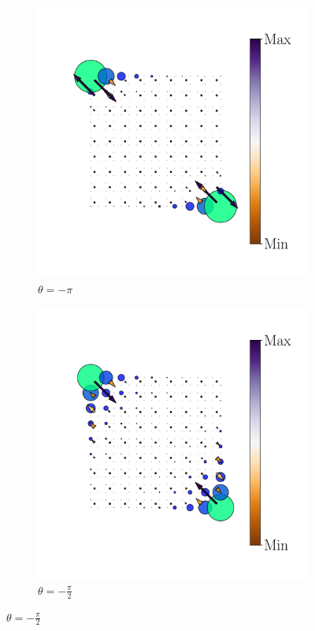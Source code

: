 \begin{figure}[tbh!]
     
     \begin{minipage}[h!]{1.0\textwidth}
          \begin{subfigure}[b!]{0.2 \textwidth}
             \caption{$\theta = -\pi$}
             \includegraphics[width=\textwidth]{Imagenes/Resultados_pump_Cuadrado/y/hoti_pomp_y_neg1.pdf}
         \end{subfigure}\hspace*{-0.5em}
          \begin{subfigure}[b!]{0.2 \textwidth}
             \caption*{$\theta = -\frac{\pi}{2}$}
             \includegraphics[width=\textwidth]{Imagenes/Resultados_pump_Cuadrado/y/hoti_pomp_y_neg2.pdf}

\end{subfigure}
\end{minipage}
\end{figure}
